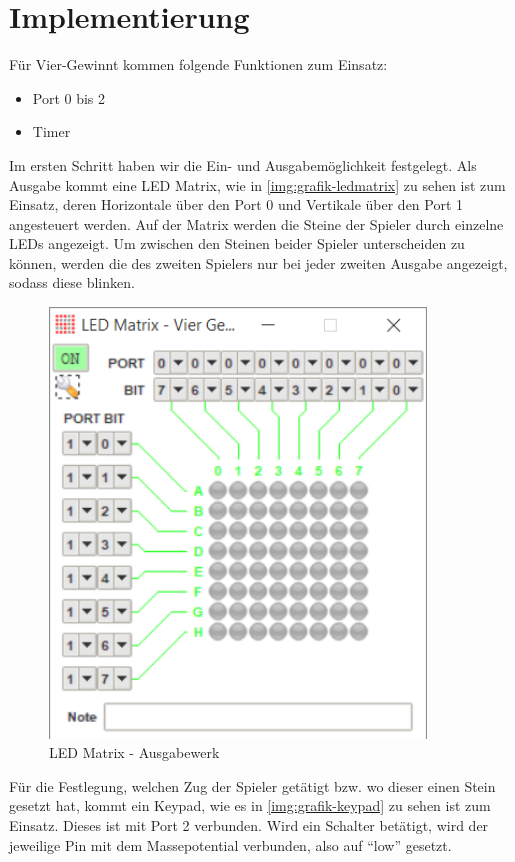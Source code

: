 \FloatBarrier
\chapter{Implementierung}
Für Vier-Gewinnt kommen folgende Funktionen zum Einsatz:
\begin{itemize}	
	\item Port 0 bis 2
	\item Timer
\end{itemize}

Im ersten Schritt haben wir die Ein- und Ausgabemöglichkeit festgelegt. Als Ausgabe kommt eine LED Matrix, wie in \autoref{img:grafik-ledmatrix} zu sehen ist zum Einsatz, deren Horizontale über den Port 0 und Vertikale über den Port 1 angesteuert werden. Auf der Matrix werden die Steine der Spieler durch einzelne LEDs angezeigt.
Um zwischen den Steinen beider Spieler unterscheiden zu können, werden die des zweiten Spielers nur bei jeder zweiten Ausgabe angezeigt, sodass diese blinken.


\begin{figure}
	\centering
	\includegraphics[width=10cm]{ledmatrix.png}
	\caption{LED Matrix - Ausgabewerk}
	\label{img:grafik-ledmatrix}
\end{figure}

Für die Festlegung, welchen Zug der Spieler getätigt bzw. wo dieser einen Stein gesetzt hat, kommt ein Keypad, wie es in \autoref{img:grafik-keypad} zu sehen ist zum Einsatz.
Dieses ist mit Port 2 verbunden. Wird ein Schalter betätigt, wird der jeweilige Pin mit dem Massepotential verbunden, also auf \enquote{low} gesetzt.

